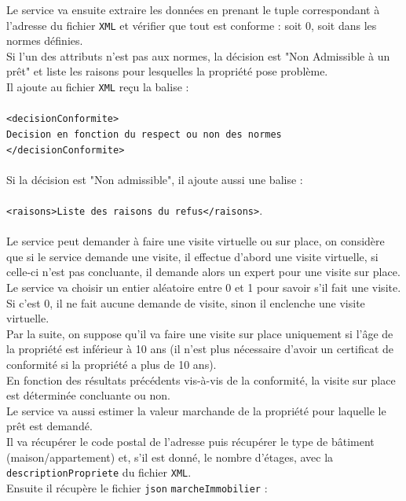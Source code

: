 \documentclass{article}
\begin{document}
	Le service va ensuite extraire les données en prenant le tuple correspondant à l’adresse du fichier \texttt{XML} et vérifier que tout est conforme : soit 0, soit dans les normes définies. \\
	Si l’un des attributs n’est pas aux normes, la décision est "Non Admissible à un prêt" et liste les raisons pour lesquelles la propriété pose problème. \\
	Il ajoute au fichier \texttt{XML} reçu la balise : \\
	\\
	\texttt{<decisionConformite>\\
	Decision en fonction du respect ou non des normes\\
	</decisionConformite>} \\
	\\
	Si la décision est "Non admissible", il ajoute aussi une balise : \\
	\\
	\texttt{<raisons>Liste des raisons du refus</raisons>}.\\
	\\
	Le service peut demander à faire une visite virtuelle ou sur place, on considère que si le service demande une visite, il effectue d'abord une visite virtuelle, si celle-ci n’est pas concluante, il demande alors un expert pour une visite sur place. \\
	Le service va choisir un entier aléatoire entre 0 et 1 pour savoir s’il fait une visite. \\
	Si  c’est 0, il ne fait aucune demande de visite, sinon il enclenche une visite virtuelle. \\
	Par la suite, on suppose qu’il va faire une visite sur place uniquement si l'âge de la propriété est inférieur à 10 ans (il n’est plus nécessaire d’avoir un certificat de conformité si la propriété a plus de 10 ans). \\
	En fonction des résultats précédents vis-à-vis de la conformité, la visite sur place est déterminée concluante ou non.\\
	Le service va aussi estimer la valeur marchande de la propriété pour laquelle le prêt est demandé. \\
	Il va récupérer le code postal de l’adresse puis récupérer le type de bâtiment (maison/appartement) et, s'il est donné, le nombre d’étages, avec la \texttt{descriptionPropriete} du fichier \texttt{XML}. \\
	Ensuite il récupère le fichier \texttt{json} \texttt{marcheImmobilier} : \\ 
\end{document}
